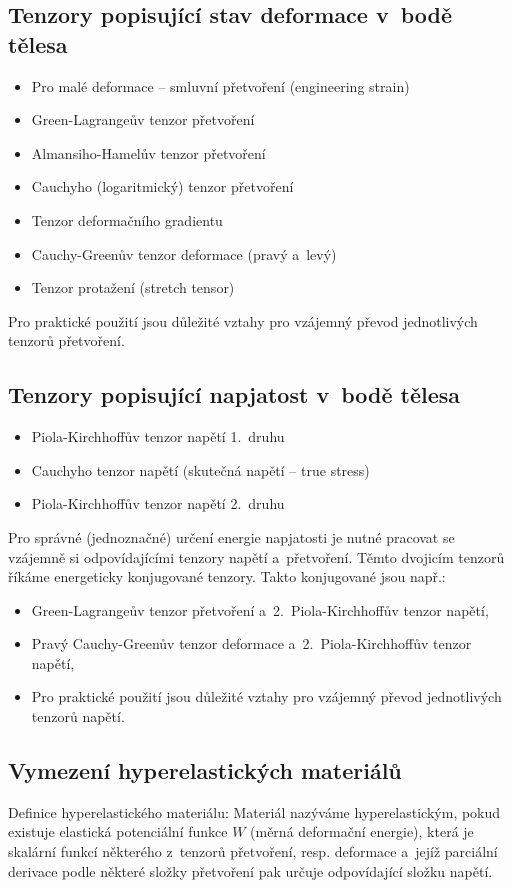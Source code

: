 \subsection{Tenzory popisující stav deformace v~bodě tělesa}
\begin{itemize}
	\item Pro malé deformace -- smluvní přetvoření (engineering strain)
	\item Green-Lagrangeův tenzor přetvoření
	\item Almansiho-Hamelův tenzor přetvoření
	\item Cauchyho (logaritmický) tenzor přetvoření
	\item Tenzor deformačního gradientu
	\item Cauchy-Greenův tenzor deformace (pravý a~levý)
	\item Tenzor protažení (stretch tensor)
\end{itemize}

Pro praktické použití jsou důležité vztahy pro vzájemný převod jednotlivých tenzorů přetvoření.

\subsection{Tenzory popisující napjatost v~bodě tělesa}
\begin{itemize}
	\item Piola-Kirchhoffův tenzor napětí 1.~druhu
	\item Cauchyho tenzor napětí (skutečná napětí -- true stress)
	\item Piola-Kirchhoffův tenzor napětí 2.~druhu
\end{itemize}

Pro správné (jednoznačné) určení energie napjatosti je nutné pracovat se vzájemně si odpovídajícími tenzory napětí a~přetvoření.
Těmto dvojicím tenzorů říkáme energeticky konjugované tenzory.
Takto konjugované jsou např.:
\begin{itemize}
	\item Green-Lagrangeův tenzor přetvoření a~2.~Piola-Kirchhoffův tenzor napětí,
	\item Pravý Cauchy-Greenův tenzor deformace a~2.~Piola-Kirchhoffův tenzor napětí,
	\item Pro praktické použití jsou důležité vztahy pro vzájemný převod jednotlivých tenzorů napětí.
\end{itemize}

\subsection{Vymezení hyperelastických materiálů}
Definice hyperelastického materiálu:
Materiál nazýváme hyperelastickým, pokud existuje elastická potenciální funkce $W$ (měrná deformační energie), která je skalární funkcí některého z~tenzorů přetvoření, resp. deformace a~jejíž parciální derivace podle některé složky přetvoření pak určuje odpovídající složku napětí.

